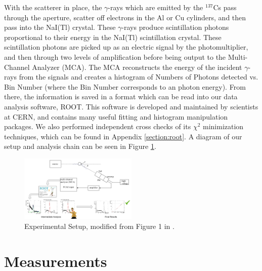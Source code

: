 \documentclass[%
 reprint,
 amsmath,amssymb,
 aps,
 pra,
]{revtex4-1}
\begin{document}
With the scatterer in place, the $\gamma$-rays which are emitted by the $^{137}$Cs pass through the aperture, scatter off electrons in the Al or Cu cylinders, and then pass into the NaI(Tl) crystal. These $\gamma$-rays produce scintillation photons proportional to their energy in the NaI(Tl) scintillation crystal. These scintillation photons are picked up as an electric signal by the photomultiplier, and then through two levels of amplification before being output to the Multi-Channel Analyzer (MCA). The MCA reconstructs the energy of the incident $\gamma$-rays from the signals and creates a histogram of Numbers of Photons detected vs. Bin Number (where the Bin Number corresponds to an photon energy). From there, the information is saved in a format which can be read into our data analysis software, ROOT. This software is developed and maintained by scientists at CERN, and contains many useful fitting and histogram manipulation packages. We also performed independent cross checks of its $\chi^2$ minimization techniques, which can be found in Appendix \ref{section:root}. A diagram of our setup and analysis chain can be seen in Figure \ref{Setup}.

\begin{figure}[H]
	\centering
	\includegraphics[width=0.5\textwidth]{Setup_full.png}
	\caption{Experimental Setup, modified from Figure 1 in \cite{manual}.}
	\label{Setup}
\end{figure}

\section{Measurements}
\end{document}
